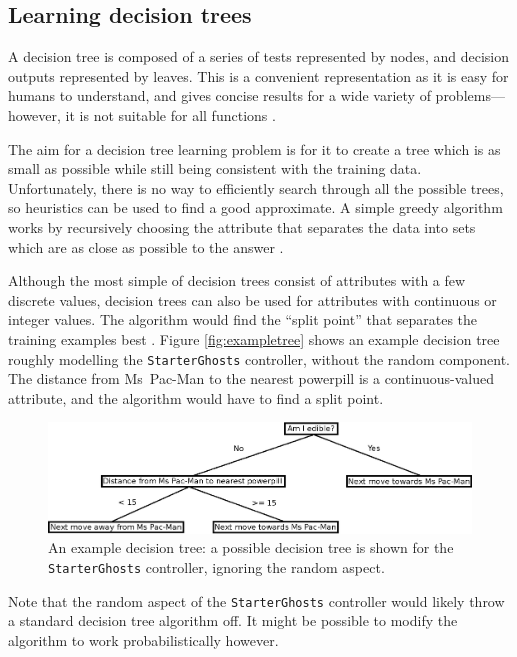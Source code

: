 \subsection{Learning decision trees}

A decision tree is composed of a series of tests represented by nodes, and decision outputs represented by leaves.  This is a convenient representation as it is easy for humans to understand, and gives concise results for a wide variety of problems---however, it is not suitable for all functions \citep[pp. 698--699]{RussellNorvig}.

The aim for a decision tree learning problem is for it to create a tree which is as small as possible while still being consistent with the training data.  Unfortunately, there is no way to efficiently search through all the possible trees, so heuristics can be used to find a good approximate.  A simple greedy algorithm works by recursively choosing the attribute that separates the data into sets which are as close as possible to the answer \citep[p. 703]{RussellNorvig}.

Although the most simple of decision trees consist of attributes with a few discrete values, decision trees can also be used for attributes with continuous or integer values.  The algorithm would find the ``split point'' that separates the training examples best \citep[p. 707]{RussellNorvig}.  Figure \ref{fig:exampletree} shows an example decision tree roughly modelling the {\tt StarterGhosts} controller, without the random component.  The distance from Ms~Pac-Man to the nearest powerpill is a continuous-valued attribute, and the algorithm would have to find a split point.

\begin{figure}[ht]
\centering
\includegraphics[width=\linewidth]{diagrams/decisiontree}
\caption[An example decision tree]{An example decision tree: a possible decision tree is shown for the {\tt StarterGhosts} controller, ignoring the random aspect.}
\label{fig:neuron}
\end{figure}

Note that the random aspect of the {\tt StarterGhosts} controller would likely throw a standard decision tree algorithm off.  It might be possible to modify the algorithm to work probabilistically however.

